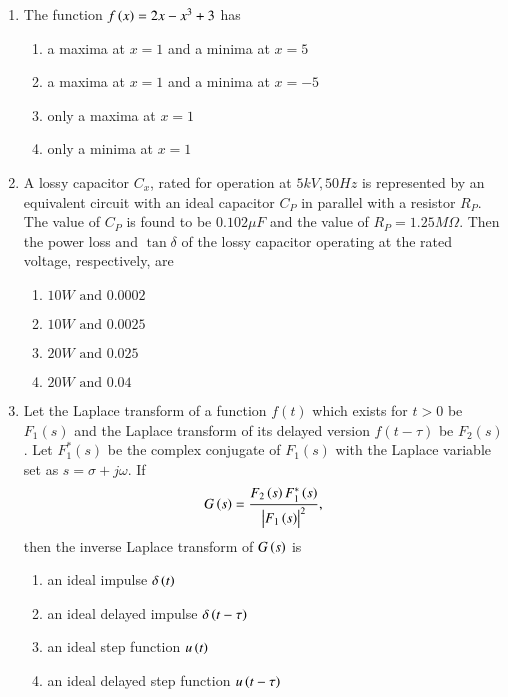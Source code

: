 \documentclass[journal]{IEEEtran}
\begin{document}
\begin{enumerate}[start=27]
	\item The function $f\left(x\right) = 2x - x^3 + 3$ has
\begin{enumerate}
\item a maxima at $x = 1$ and a minima at $x = 5$
\item a maxima at $x = 1$ and a minima at $x = -5$
\item only a maxima at $x = 1$
\item only a minima at $x = 1$
\end{enumerate}


\item A lossy capacitor $C_x$, rated for operation at $5 kV, 50 Hz$ is represented by an equivalent circuit with an ideal capacitor $C_P$ in parallel with a resistor $R_P$. The value of $C_P$ is found to be $0.102\mu F$ and the value of $R_P = 1.25 M\Omega$. Then the power loss and $\tan \delta$ of the lossy capacitor operating at the rated voltage, respectively, are
\begin{multicols}{2}
\begin{enumerate}
\item  $10 W \text{ and } 0.0002$
\item  $10 W \text{ and } 0.0025$
\item  $20 W \text{ and }0.025$
\item  $20 W \text{ and }0.04$
\end{enumerate}
\end{multicols}

\item Let the Laplace transform of a function $f(t)$ which exists for $t > 0$ be $F_1(s)$ and the Laplace transform of its delayed version $f(t - \tau)$ be $F_2(s)$. Let $F_1^*(s)$ be the complex conjugate of $F_1(s)$ with the Laplace variable set as $s = \sigma + j\omega$. If 
\begin{align*}
G\left(s\right) = \frac{F_2\left(s\right)F_1^*\left(s\right)}{\begin{vmatrix}F_1\left(s\right)\end{vmatrix}^2}, 
\end{align*}
then the inverse Laplace transform of $G\left(s\right)$ is
\begin{multicols}{2}
\begin{enumerate}
\item an ideal impulse $\delta\left(t\right)$
\item  an ideal delayed impulse $\delta\left(t - \tau\right)$
\item  an ideal step function $u\left(t\right)$
\item an ideal delayed step function $u\left(t - \tau\right)$
\end{enumerate}
\end{multicols}


\end{enumerate}
\end{document}
